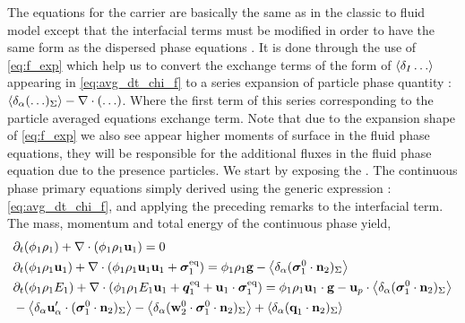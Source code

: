 The equations for the carrier are basically the same as in the classic to fluid model except that the interfacial terms must be modified in order to have the same form as the dispersed phase equations \citep{jackson1997locally,zhang1994averaged}. 
It is done through the use of \ref{eq:f_exp} which help us to convert the exchange terms of the form of $\left<\delta_I \ldots \right>$ appearing in \ref{eq:avg_dt_chi_f} to a series expansion of particle phase  quantity : $\left<\delta_\alpha ( \ldots )_{\Sigma}\right> - \mathbf{\nabla}\cdot (\ldots)$. 
Where the first term of this series corresponding to the particle averaged equations exchange term. 
Note that due to the expansion shape of \ref{eq:f_exp} we also see appear higher moments of surface in the fluid phase equations, they will be responsible for the additional fluxes in the fluid phase equation due to the presence particles. 
We start by exposing the . 
The continuous phase primary equations simply derived using the generic expression : \ref{eq:avg_dt_chi_f}, and applying the preceding remarks to the interfacial term. 
The mass, momentum and total energy of the continuous phase yield, 
\begin{align}
    \label{eq:dt_hybrid_rho}
    &\partial_t (\phi_1 \rho_1)  
    + \mathbf{\nabla}\cdot (
        \phi_1 \rho_1\textbf{u}_1
    )
    = 
    0\\
    \label{eq:dt_hybrid_rhou_1}
    &\partial_t (\phi_1 \rho_1\textbf{u}_1)  
    + \mathbf{\nabla}\cdot (
        \phi_1 \rho_1\textbf{u}_1\textbf{u}_1
        + \bm{\sigma}_1^\text{eq}
    )
    = 
    \phi_1 \rho_1 \textbf{g} 
    - \left<\delta_\alpha ( {\bm{\sigma}_1^0 \cdot \textbf{n}_2} )_{\Sigma}\right>
    \\
    \label{eq:dt_hybrid_rhoE_1}
    &\partial_t (\phi_1\rho_1E_1)  
    + \mathbf{\nabla}\cdot (
        \phi_1\rho_1E_1\textbf{u}_1
        + \bm{q}_1^\text{eq}
        + \textbf{u}_1 \cdot \bm{\sigma}_1^\text{eq}
        )
    = 
    \phi_1 \rho_1\textbf{u}_1 \cdot \textbf{g} 
    - \textbf{u}_p \cdot \left<\delta_\alpha ( {\bm{\sigma}_1^0 \cdot \textbf{n}_2} )_{\Sigma}\right>\nonumber \\
    &- \left<\delta_\alpha  \textbf{u}_\alpha' \cdot (   \bm{\sigma}_1^0 \cdot \textbf{n}_2 )_{\Sigma}\right>
    - \left<\delta_\alpha  ( \textbf{w}_2^0 \cdot \bm{\sigma}_1^0 \cdot \textbf{n}_2 )_{\Sigma}\right>
    + \left<\delta_\alpha ( {\textbf{q}_1\cdot \textbf{n}_2} )_{\Sigma}\right>
\end{align} 
